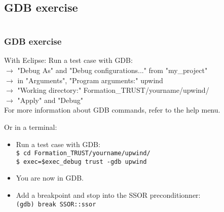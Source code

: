 \documentclass[10pt, hyperref={unicode=true,pdfusetitle, bookmarks=true,bookmarksnumbered=false,bookmarksopen=false, breaklinks=false,pdfborder={0 0 1},backref=true,colorlinks=true,linkcolor=darkblue,pageanchor, urlcolor=darkblue}]{beamer}
\begin{document}
\subsection{{\bf{GDB exercise}}}
\begin{frame}
\begin{columns}[c] 
\tableofcontents[sections={1-4},currentsection, currentsubsection]
\tableofcontents[sections={5-8},currentsection, currentsubsection]
\end{columns}
\end{frame}
\begin{frame}
\frametitle{GDB exercise}

\begin{exampleblock}{With Eclipse:}
Run a test case with GDB:\\
    $\rightarrow$ "Debug As" and "Debug configurations..." from "my\_project"\\
    $\rightarrow$ in "Arguments", "Program arguments:" upwind\\
    $\rightarrow$ "Working directory:"  Formation\_TRUST/yourname/upwind/\\
    $\rightarrow$ "Apply" and "Debug"\\
For more information about GDB commands, refer to the help menu.\\
\end{exampleblock}

\begin{block}{Or in a terminal:} 
\begin{itemize}
\item Run a test case with GDB:\\   
    \texttt{\$ cd Formation\_TRUST/yourname/upwind/}\\
    \texttt{\$ exec=\$exec\_debug trust -gdb upwind}
\item You are now in GDB.
\item Add a breakpoint and stop into the SSOR preconditionner:\\
\texttt{(gdb) break SSOR::ssor}
\end{itemize}
\end{block}

\end{frame}
\end{document}
